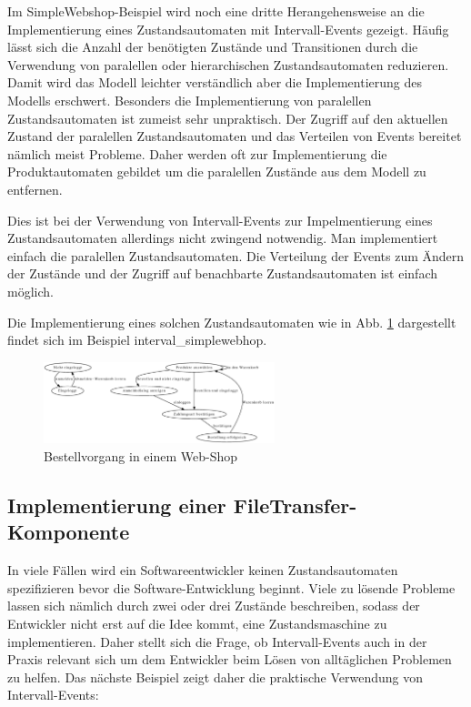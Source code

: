Im SimpleWebshop-Beispiel wird noch eine dritte Herangehensweise an die
Implementierung eines Zustandsautomaten mit Intervall-Events gezeigt. Häufig
lässt sich die Anzahl der benötigten Zustände und Transitionen durch die
Verwendung von paralellen oder hierarchischen Zustandsautomaten reduzieren.
Damit wird das Modell leichter verständlich aber die Implementierung des Modells
erschwert. 
Besonders die Implementierung von paralellen Zustandsautomaten ist zumeist sehr
unpraktisch. Der Zugriff auf den aktuellen Zustand der paralellen
Zustandsautomaten und das Verteilen von Events bereitet nämlich meist
Probleme. Daher werden oft zur Implementierung die Produktautomaten gebildet um
die paralellen Zustände aus dem Modell zu entfernen.

Dies ist bei der Verwendung von Intervall-Events zur Impelmentierung eines
Zustandsautomaten allerdings nicht zwingend notwendig. Man implementiert einfach
die paralellen Zustandsautomaten. Die Verteilung der Events zum Ändern der
Zustände und der Zugriff auf benachbarte Zustandsautomaten ist einfach möglich.

Die Implementierung eines solchen Zustandsautomaten wie in Abb.
\ref{webshop_behaviour} dargestellt findet sich im Beispiel
interval\_simplewebhop.

\begin{figure}[htp]
\begin{center}
  \includegraphics[width=0.6\textwidth]{graphics/webshop.dot.eps}
  \caption{Bestellvorgang in einem Web-Shop}
  \label{webshop_behaviour}
\end{center}
\end{figure}

\subsection{Implementierung einer FileTransfer-Komponente}
In viele Fällen wird ein Softwareentwickler keinen Zustandsautomaten
spezifizieren bevor die Software-Entwicklung beginnt. Viele zu lösende Probleme
lassen sich nämlich durch zwei oder drei Zustände beschreiben, sodass der
Entwickler nicht erst auf die Idee kommt, eine Zustandsmaschine zu
implementieren. Daher stellt sich die Frage, ob Intervall-Events auch in der
Praxis relevant sich um dem Entwickler beim Lösen von alltäglichen Problemen zu
helfen. Das nächste Beispiel zeigt daher die praktische Verwendung von
Intervall-Events:

